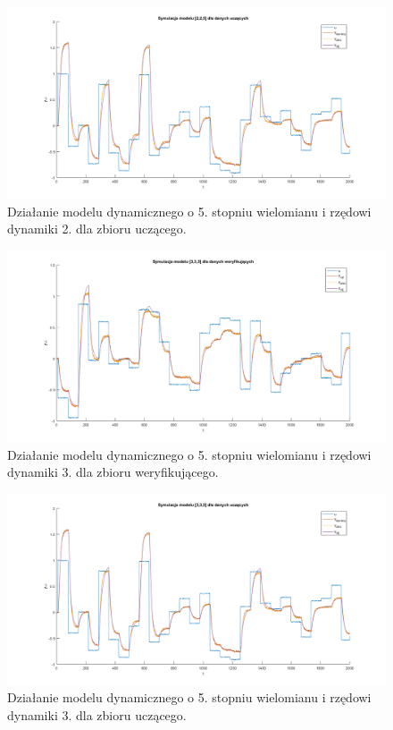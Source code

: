\begin{figure}[H]
\centering
\includegraphics[width=16cm,trim={3cm 0.5cm 3cm 0.5cm},clip]{images/d28.png}
\caption{Działanie modelu dynamicznego o 5. stopniu wielomianu i rzędowi dynamiki 2. dla zbioru uczącego.}
\label{fig:d28}
\end{figure}
\begin{figure}[H]
\centering
\includegraphics[width=16cm,trim={3cm 0.5cm 3cm 0.5cm},clip]{images/d29.png}
\caption{Działanie modelu dynamicznego o 5. stopniu wielomianu i rzędowi dynamiki 3. dla zbioru weryfikującego.}
\label{fig:d29}
\end{figure}
\begin{figure}[H]
\centering
\includegraphics[width=16cm,trim={3cm 0.5cm 3cm 0.5cm},clip]{images/d30.png}
\caption{Działanie modelu dynamicznego o 5. stopniu wielomianu i rzędowi dynamiki 3. dla zbioru uczącego.}
\label{fig:d30}
\end{figure}
